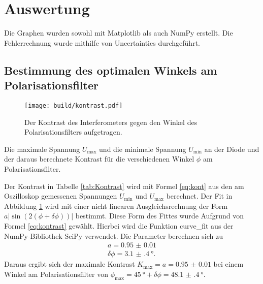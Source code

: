 \section{Auswertung}
\label{sec:Auswertung}
Die Graphen wurden sowohl mit Matplotlib \cite{matplotlib} als auch NumPy \cite{numpy} erstellt. Die
Fehlerrechnung wurde mithilfe von Uncertainties \cite{uncertainties} durchgeführt.
\subsection{Bestimmung des optimalen Winkels am Polarisationsfilter}
\label{ssec:polar}
\begin{figure}
	\centering
	\texttt{[image: build/kontrast.pdf]}
	\caption{Der Kontrast des Interferometers gegen den Winkel des Polarisationsfilters aufgetragen.}
	\label{fig:kontrast}
\end{figure}
\begin{table}
	\centering
	\caption{Die maximale Spannung $U_\text{max}$ und die minimale Spannung $U_\text{min}$ an der Diode und der daraus berechnete Kontrast für die verschiedenen Winkel $\phi$ am Polarisationsfilter.}
	
\end{table}
Der Kontrast in Tabelle \ref{tab:Kontrast} wird mit Formel \eqref{eq:kont} aus den am Oszilloskop gemessenen Spannungen $U_\text{min}$ und $U_\text{max}$ berechnet. Der Fit in Abbildung \ref{fig:kontrast} wird mit einer nicht linearen Ausgleichsrechnung der Form $a |\sin(2(\phi+\delta\phi))|$ bestimmt. Diese Form des Fittes wurde Aufgrund von Formel \eqref{eq:kontrast} gewählt. Hierbei wird die Funktion curve\_fit aus der NumPy-Bibliothek SciPy \cite{scipy} verwendet. Die Parameter berechnen sich zu
\begin{gather*}
a=\num{0.95(1)}\\
\delta\phi=\SI{3.1(4)}{\degree}.
\end{gather*}
Daraus ergibt sich der maximale Kontrast $K_\text{max}=a=\num{0.95(1)}$ bei einem Winkel am Polarisationsfilter von $\phi_\text{max}=\SI{45}{\degree}+\delta\phi=\SI{48.1(4)}{\degree}$.

